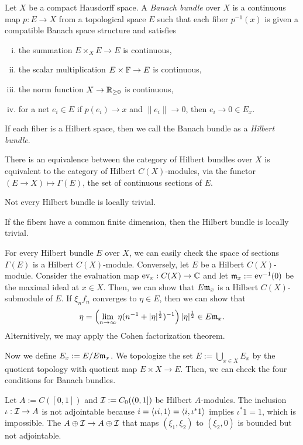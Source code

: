 \documentclass{../../../small}
\begin{document}
\begin{ex}
Let $X$ be a compact Hausdorff space.
A \emph{Banach bundle} over $X$ is a continuous map $p:E\to X$ from a topological space $E$ such that each fiber $p^{-1}(x)$ is given a compatible Banach space structure and satisfies
\begin{enumerate}[(i)]
\item the summation $E\times_X E\to E$ is continuous,
\item the scalar multiplication $E\times\mathbb{F}\to E$ is continuous,
\item the norm function $X\to\mathbb{R}_{\ge0}$ is continuous,
\item for a net $e_i\in E$ if $p(e_i)\to x$ and $\|e_i\|\to0$, then $e_i\to 0\in E_x$.
\end{enumerate}
If each fiber is a Hilbert space, then we call the Banach bundle as a \emph{Hilbert bundle}.
\begin{parts}
\item There is an equivalence between the category of Hilbert bundles over $X$ is equivalent to the category of Hilbert $C(X)$-modules,
via the functor $(E\to X)\mapsto\Gamma(E)$, the set of continuous sections of $E$.
\item Not every Hilbert bundle is locally trivial.
\item If the fibers have a common finite dimension, then the Hilbert bundle is locally trivial.
\end{parts}
\end{ex}
\begin{pf}
For every Hilbert bundle $E$ over $X$, we can easily check the space of sections $\Gamma(E)$ is a Hilbert $C(X)$-module.
Conversely, let $E$ be a Hilbert $C(X)$-module.
Consider the evaluation map $\mathrm{ev}_x:C(X)\to\mathbb{C}$ and let $\mathfrak{m}_x:=\mathrm{ev}^{-1}(0)$ be the maximal ideal at $x\in X$.
Then, we can show that $E\mathfrak{m}_x$ is a Hilbert $C(X)$-submodule of $E$.
If $\xi_nf_n$ converges to $\eta\in E$, then we can show that
\[\eta=\left(\lim_{n\to\infty}\eta(n^{-1}+|\eta|^{\frac12})^{-1}\right)|\eta|^{\frac12}\in E\mathfrak{m}_x.\]
Alternitively, we may apply the Cohen factorization theorem.

Now we define $E_x:=E/E\mathfrak{m}_x$.
We topologize the set $E:=\bigcup_{x\in X}E_x$ by the quotient topology with quotient map $E\times X\to E$.
Then, we can check the four conditions for Banach bundles.
\end{pf}

\begin{ex}
Let $A:=C([0,1])$ and $\mathcal{I}:=C_0((0,1])$ be Hilbert $A$-modules.
The inclusion $\iota:\mathcal{I}\to A$ is not adjointable because $i=\langle\iota i,1\rangle=\langle i,\iota^* 1\rangle$ implies $\iota^*1=1$, which is impossible.
The $A\oplus\mathcal{I}\to A\oplus\mathcal{I}$ that maps $(\xi_1,\xi_2)$ to $(\xi_2,0)$ is bounded but not adjointable.
\end{ex}
\end{document}
